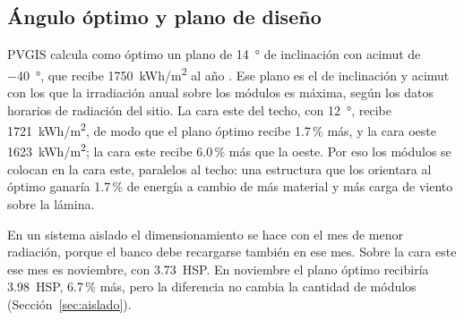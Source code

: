 \subsection{Ángulo óptimo y plano de diseño}

PVGIS calcula como óptimo un plano de \SI{14}{\degree} de inclinación con acimut de \SI{-40}{\degree}, que recibe \SI{1750}{kWh/m^2} al año \cite{pvgis}. Ese plano es el de inclinación y acimut con los que la irradiación anual sobre los módulos es máxima, según los datos horarios de radiación del sitio. La cara este del techo, con \SI{12}{\degree}, recibe \SI{1721}{kWh/m^2}, de modo que el plano óptimo recibe 1.7\,\% más, y la cara oeste \SI{1623}{kWh/m^2}; la cara este recibe 6.0\,\% más que la oeste. Por eso los módulos se colocan en la cara este, paralelos al techo: una estructura que los orientara al óptimo ganaría 1.7\,\% de energía a cambio de más material y más carga de viento sobre la lámina.

En un sistema aislado el dimensionamiento se hace con el mes de menor radiación, porque el banco debe recargarse también en ese mes. Sobre la cara este ese mes es noviembre, con \SI{3.73}{HSP}. En noviembre el plano óptimo recibiría \SI{3.98}{HSP}, 6.7\,\% más, pero la diferencia no cambia la cantidad de módulos (Sección~\ref{sec:aislado}).
